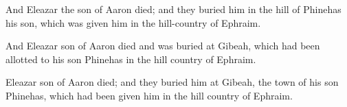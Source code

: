 			\begin{versebox}
					\item[BHS] 
					\item[ASV] And Eleazar the son of Aaron died; and they buried him in the hill of Phinehas his son, which was given him in the hill-country of Ephraim.
					\item[NIV] And Eleazar son of Aaron died and was buried at Gibeah, which had been allotted to his son Phinehas in the hill country of Ephraim.
					\item[NRSV] Eleazar son of Aaron died; and they buried him at Gibeah, the town of his son Phinehas, which had been given him in the hill country of Ephraim.
			\end{versebox}